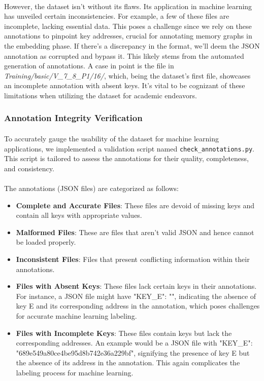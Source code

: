         \paragraph{}However, the dataset isn't without its flaws. Its application in machine learning has unveiled certain inconsistencies. For example, a few of these files are incomplete, lacking essential data. This poses a challenge since we rely on these annotations to pinpoint key addresses, crucial for annotating memory graphs in the embedding phase. If there's a discrepancy in the format, we'll deem the JSON annotation as corrupted and bypass it. This likely stems from the automated generation of annotations. A case in point is the file in \textit{Training/basic/V\_7\_8\_P1/16/}, which, being the dataset's first file, showcases an incomplete annotation with absent keys. It's vital to be cognizant of these limitations when utilizing the dataset for academic endeavors.
        
        \subsubsection{Annotation Integrity Verification}
            \paragraph{}To accurately gauge the usability of the dataset for machine learning applications, we implemented a validation script named \texttt{check\_annotations.py}. This script is tailored to assess the annotations for their quality, completeness, and consistency.

            \paragraph{}The annotations (JSON files) are categorized as follows:
            \begin{itemize}
                \item \textbf{Complete and Accurate Files}: These files are devoid of missing keys and contain all keys with appropriate values.
                \item \textbf{Malformed Files}: These are files that aren't valid JSON and hence cannot be loaded properly.
                \item \textbf{Inconsistent Files}: Files that present conflicting information within their annotations.
                \item \textbf{Files with Absent Keys}: These files lack certain keys in their annotations. For instance, a JSON file might have "KEY\_E": "", indicating the absence of key E and its corresponding address in the annotation, which poses challenges for accurate machine learning labeling.
                \item \textbf{Files with Incomplete Keys}: These files contain keys but lack the corresponding addresses. An example would be a JSON file with "KEY\_E": "689e549a80ce4be95d8b742e36a229bf", signifying the presence of key E but the absence of its address in the annotation. This again complicates the labeling process for machine learning.
            \end{itemize}

